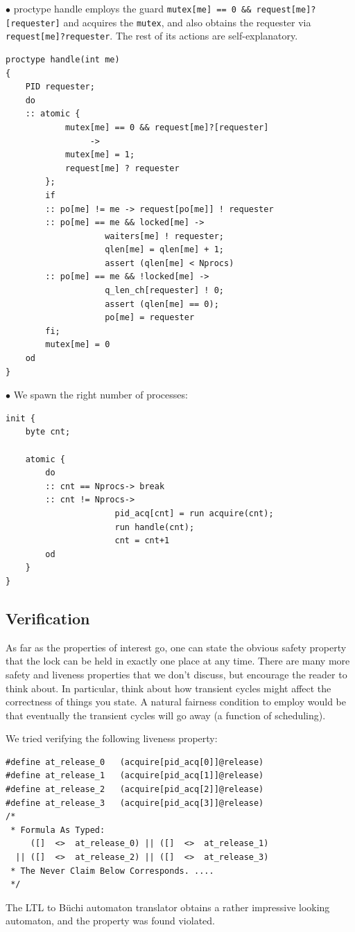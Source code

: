 \documentclass[11pt]{article}
\begin{document}
\noindent$\bullet$
proctype handle employs
the guard {\tt mutex[me] == 0 \&\& request[me]?[requester]} and
acquires the {\tt mutex}, and also obtains the
requester via {\tt request[me]?requester}.
%
The rest of its actions are self-explanatory.
%
\begin{small}
\begin{verbatim}        
proctype handle(int me)
{
    PID requester;
    do
    :: atomic {
            mutex[me] == 0 && request[me]?[requester]
                 ->
            mutex[me] = 1;
            request[me] ? requester
        };
        if
        :: po[me] != me -> request[po[me]] ! requester
        :: po[me] == me && locked[me] ->
                    waiters[me] ! requester;
                    qlen[me] = qlen[me] + 1;
                    assert (qlen[me] < Nprocs)
        :: po[me] == me && !locked[me] ->
                    q_len_ch[requester] ! 0;
                    assert (qlen[me] == 0);
                    po[me] = requester
        fi;
        mutex[me] = 0
    od
}
\end{verbatim}
\end{small}

\noindent$\bullet$ We spawn the right number of processes:
\begin{small}
\begin{verbatim}  
init {
    byte cnt;

    atomic {
        do
        :: cnt == Nprocs-> break
        :: cnt != Nprocs->
                      pid_acq[cnt] = run acquire(cnt);
                      run handle(cnt);
                      cnt = cnt+1
        od
    }
}
\end{verbatim}
\end{small}

\subsection{Verification}

As far as the properties of interest go,
one can state the obvious safety property that the lock
can be held in exactly one place at any time.
%
There are many more safety and liveness properties that
we don't discuss, but encourage the reader to think about.
%
In particular, think about how transient cycles might affect
the correctness of things you state.
%
A natural fairness condition to employ would be that eventually
the transient cycles will go away (a function of scheduling).

We tried verifying the following liveness property:
\begin{small}
\begin{verbatim}
#define at_release_0   (acquire[pid_acq[0]]@release)
#define at_release_1   (acquire[pid_acq[1]]@release)
#define at_release_2   (acquire[pid_acq[2]]@release)
#define at_release_3   (acquire[pid_acq[3]]@release)
/*
 * Formula As Typed:
     ([]  <>  at_release_0) || ([]  <>  at_release_1)
  || ([]  <>  at_release_2) || ([]  <>  at_release_3)
 * The Never Claim Below Corresponds. ....
 */
\end{verbatim}
\end{small}
The LTL to B\"{u}chi automaton translator obtains a rather impressive
looking automaton, and the property was found violated.
\end{document}
